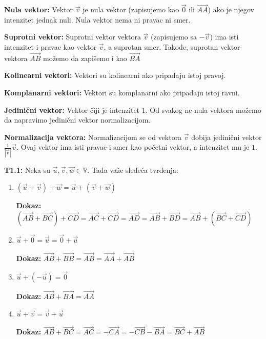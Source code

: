 \documentclass[12pt]{article}
\newcommand{\vek}[1]{\overrightarrow{#1}}
\begin{document}
\textbf{Nula vektor:} Vektor $\vek{v}$ je nula vektor (zapisujemo kao $\vek{0}$
ili $\vek{AA}$) ako je njegov intenzitet jednak nuli. Nula vektor nema ni
pravac ni smer.
\par

\textbf{Suprotni vektor:} Suprotni vektor vektora $\vek{v}$ (zapisujemo sa
$-\vek{v}$) ima isti intenzitet i pravac kao vektor $\vek{v}$, a suprotan smer.
Takođe, suprotan vektor vektora $\vek{AB}$ možemo da zapišemo i kao $\vek{BA}$
\par

\textbf{Kolinearni vektori:} Vektori su kolinearni ako pripadaju istoj pravoj.
\par

\textbf{Komplanarni vektori:} Vektori su komplanarni ako pripadaju istoj ravni.
\par

\textbf{Jedinični vektor:} Vektor čiji je intenzitet $1$. Od svakog ne-nula
vektora možemo da napravimo jedinični vektor normalizacijom.
\par

\textbf{Normalizacija vektora:} Normalizacijom se od vektora $\vek{v}$ dobija
jedinični vektor $\frac{1}{|\vek{v}|}\vek{v}$. Ovaj vektor ima isti pravac
i smer kao početni vektor, a intenzitet mu je $1$.
\par

\textbf{T1.1:} Neka su $\vek{u}, \vek{v}, \vek{w}\in\mathbb{V}$. Tada važe
sledeća tvrđenja:
\begin{enumerate}[label=\textbf{(S\arabic*)}]
    \item $(\vek{u}+\vek{v})+\vek{w}=\vek{u}+(\vek{v}+\vek{w})$\par
          \textbf{Dokaz:}
          $(\vek{AB}+\vek{BC})+\vek{CD}=\vek{AC}+\vek{CD}=\vek{AD}
              =\vek{AB}+\vek{BD}=\vek{AB}+(\vek{BC}+\vek{CD})$
    \item
          $\vek{u}+\vek{0}=\vek{u}=\vek{0}+\vek{u}$\par
          \textbf{Dokaz:}
          $\vek{AB}+\vek{BB}=\vek{AB}=\vek{AA}+\vek{AB}$
    \item $\vek{u}+(-\vek{u})=\vek{0}$\par
          \textbf{Dokaz:}
          $\vek{AB}+\vek{BA}=\vek{AA}$
    \item $\vek{u}+\vek{v}=\vek{v}+\vek{u}$\par
          \textbf{Dokaz:}
          $\vek{AB}+\vek{BC}=\vek{AC}=-\vek{CA}=-\vek{CB}-\vek{BA}
              =\vek{BC}+\vek{AB}$
\end{enumerate}
\end{document}

